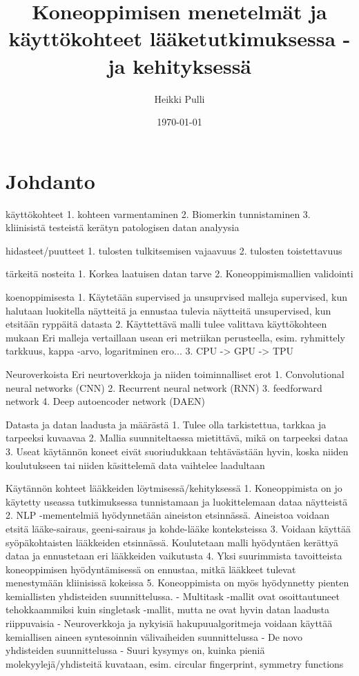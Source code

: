 \documentclass[finnish,twoside,censored,essay,sw-line]{HYthesisML}
\title{Koneoppimisen menetelmät ja käyttökohteet lääketutkimuksessa -ja kehityksessä}
\author{Heikki Pulli}
\date{\today}
\begin{document}
\maketitle

\mytableofcontents
\mainmatter

\chapter{Johdanto}

käyttökohteet
1.  kohteen varmentaminen
2.  Biomerkin tunnistaminen
3.  kliinisistä testeistä kerätyn patologisen datan analyysia

hidasteet/puutteet
1.  tulosten tulkitsemisen vajaavuus
2.  tulosten toistettavuus

tärkeitä nosteita
1.  Korkea laatuisen datan tarve
2.  Koneoppimismallien validointi

koenoppimisesta
1.  Käytetään supervised ja unsuprvised malleja
supervised, kun halutaan luokitella näytteitä ja ennustaa tulevia näytteitä
unsupervised, kun etsitään ryppäitä datasta
2.  Käyttettävä malli tulee valittava käyttökohteen mukaan
Eri malleja vertaillaan usean eri metriikan perusteella, esim. ryhmittely tarkkuus, kappa -arvo,
logaritminen ero...
3. CPU -> GPU -> TPU

Neuroverkoista
Eri neurtoverkkoja ja niiden toiminnalliset erot
1.  Convolutional neural networks (CNN)
2.  Recurrent neural network (RNN)
3.  feedforward network
4.  Deep autoencoder network (DAEN)

Datasta ja datan laadusta ja määrästä
1.  Tulee olla tarkistettua, tarkkaa ja tarpeeksi kuvaavaa
2.  Mallia suunniteltaessa mietittävä, mikä on tarpeeksi dataa
3.  Useat käytännön koneet eivät suoriudukkaan tehtävästään hyvin, koska
niiden koulutukseen tai niiden käsittelemä data vaihtelee laadultaan

Käytännön kohteet lääkkeiden löytmisessä/kehityksessä
1.  Koneoppimista on jo käytetty useassa tutkimuksessa tunnistamaan ja luokittelemaan
dataa näytteistä
2.  NLP -mementelmiä hyödynnetään aineiston etsinnässä. Aineistoa voidaan etsitä
lääke-sairaus, geeni-sairaus ja kohde-lääke konteksteissa
3.  Voidaan käyttää syöpäkohtaisten lääkkeiden etsinnässä. Koulutetaan malli hyödyntäen
kerättyä dataa ja ennustetaan eri lääkkeiden vaikutusta
4.  Yksi suurimmista tavoitteista koneoppimisen hyödyntämisessä on ennustaa, mitkä lääkkeet tulevat
menestymään kliinisissä kokeissa
5.  Koneoppimista on myös hyödynnetty pienten kemiallisten yhdisteiden suunnittelussa.
- Multitask -mallit ovat osoittautuneet tehokkaammiksi kuin singletask -mallit, mutta ne ovat hyvin datan laadusta riippuvaisia
- Neuroverkkoja ja nykyisiä hakupuualgoritmeja voidaan käyttää kemiallisen aineen syntesoinnin välivaiheiden suunnittelussa
- De novo yhdisteiden suunnittelussa
- Suuri kysymys on, kuinka pieniä molekyylejä/yhdisteitä kuvataan, esim. circular fingerprint, symmetry functions
\end{document}
